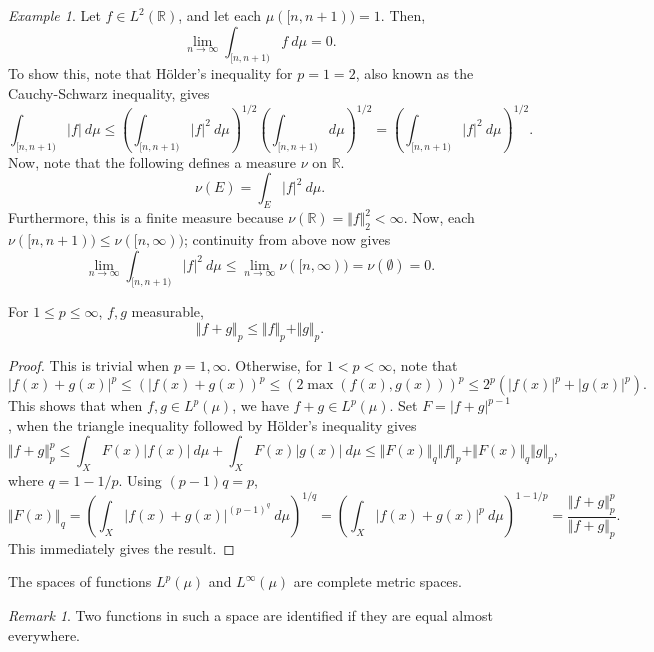 \documentclass[11pt]{article}
\newcommand{\R}{\mathbb{R}}
\newcommand{\norm}[1]{\Vert #1 \Vert}
\theoremstyle{definition}
\theoremstyle{remark}
\newtheorem*{remark}{Remark}
\newtheorem*{example}{Example}
\numberwithin{equation}{section}
\begin{document}
    \begin{example}
        Let $f \in L^2(\R)$, and let each $\mu([n, n + 1)) = 1$. Then, \[
            \lim_{n \to \infty} \int_{[n, n + 1)} f\:d\mu = 0.
        \] To show this, note that H\"older's inequality for $p = 1 = 2$, also known
        as the Cauchy-Schwarz inequality, gives \[
            \int_{[n, n + 1)} |f|\:d\mu \leq \left(\int_{[n, n +
            1)}|f|^2\:d\mu\right)^{1 / 2}\left(\int_{[n, n + 1)}d\mu\right)^{1 / 2} =
            \left(\int_{[n, n + 1)} |f|^2\:d\mu\right)^{1 / 2}.
        \] Now, note that the following defines a measure $\nu$ on $\R$. \[
            \nu(E) = \int_E |f|^2\:d\mu.
        \] Furthermore, this is a finite measure because $\nu(\R) = \norm{f}_2^2 <
        \infty$. Now, each $\nu([n, n + 1)) \leq \nu([n, \infty))$; continuity
        from above now gives \[
            \lim_{n \to \infty} \int_{[n, n + 1)} |f|^2\:d\mu \leq \lim_{n \to
            \infty} \nu([n, \infty)) = \nu(\emptyset) = 0.
        \] 
    \end{example}
    
    \begin{lemma}[Minkowski]
        For $1 \leq p \leq \infty$, $f, g$ measurable, \[
            \norm{f + g}_p \leq \norm{f}_p + \norm{g}_p.
        \] 
    \end{lemma}
    \begin{proof}
        This is trivial when $p = 1, \infty$. Otherwise, for $1 < p < \infty$, note
        that \[
            |f(x) + g(x)|^p \leq \left(|f(x) + g(x)\right)^p \leq \left(2\max(f(x),
            g(x))\right)^p \leq 2^p\left(|f(x)|^p + |g(x)|^p\right).
        \] This shows that when $f, g \in L^p(\mu)$, we have $f + g \in L^p(\mu)$.
        Set $F = |f + g|^{p - 1}$, when the triangle inequality followed by
        H\"older's inequality gives \[
            \norm{f + g}_p^p \leq \int_X F(x)|f(x)|\:d\mu + \int_X F(x)|g(x)|\:d\mu
            \leq \norm{F(x)}_q\norm{f}_p + \norm{F(x)}_q\norm{g}_p,
        \] where $q = 1 - 1 /p$. Using $(p - 1)q = p$, \[
            \norm{F(x)}_q = \left(\int_X |f(x) + g(x)|^{(p - 1)^q} \:d\mu\right)^{1 /
            q} = \left(\int_X |f(x) + g(x)|^p \:d\mu\right)^{1 - 1 / p} =
            \frac{\norm{f + g}_p^p}{\norm{f + g}_p}.
        \] This immediately gives the result.
    \end{proof}

    \begin{theorem}
        The spaces of functions $L^p(\mu)$ and $L^\infty(\mu)$ are complete metric
        spaces.
        \begin{remark}
            Two functions in such a space are identified if they are equal almost
            everywhere.
        \end{remark}
    \end{theorem}
\end{document}
